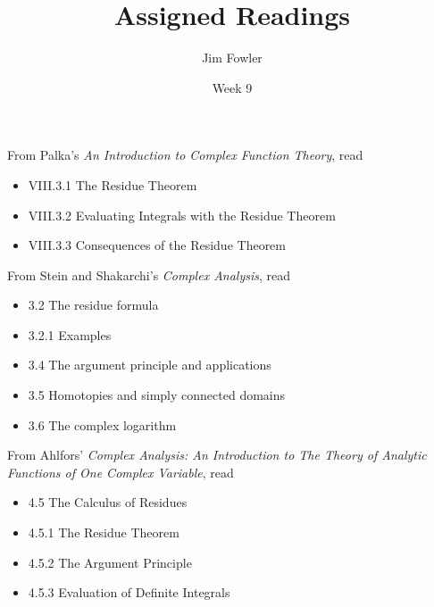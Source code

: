 \documentclass{homework}
\author{Jim Fowler}
\title{Assigned Readings}
\date{Week 9}
\begin{document}
\maketitle


From Palka's \textit{An Introduction to Complex Function Theory}, read
\begin{itemize}
\item VIII.3.1 The Residue Theorem
\item VIII.3.2 Evaluating Integrals with the Residue Theorem
\item VIII.3.3 Consequences of the Residue Theorem
\end{itemize}

From Stein and Shakarchi's \textit{Complex Analysis}, read
\begin{itemize}
\item 3.2 The residue formula
\item 3.2.1 Examples
\item 3.4 The argument principle and applications
\item 3.5 Homotopies and simply connected domains
\item 3.6 The complex logarithm
\end{itemize}

From Ahlfors' \textit{Complex Analysis: An Introduction to The Theory of Analytic Functions of One Complex Variable}, read
\begin{itemize}
\item 4.5 The Calculus of Residues
\item 4.5.1 The Residue Theorem
\item 4.5.2 The Argument Principle
\item 4.5.3 Evaluation of Definite Integrals
\end{itemize}
\end{document}
